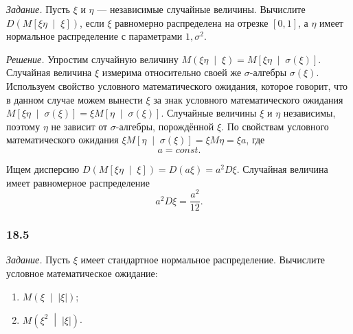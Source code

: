 \textit{Задание.} Пусть $ \xi $ и $ \eta $ --- независимые случайные величины.
Вычислите $D \left( M \left[ \xi \eta \; \middle| \; \xi \right] \right) $,
если $ \xi $ равномерно распределена на отрезке $ \left[ 0, 1 \right] $,
а $ \eta $ имеет нормальное распределение с параметрами $1, \sigma^2$.

\textit{Решение.} Упростим случайную величину
$M \left( \xi \eta \; \middle| \; \xi \right) =
  M \left[ \xi \eta \; \middle| \; \sigma \left( \xi \right) \right] $.
Случайная величина $ \xi $ измерима относительно своей же $ \sigma $-алгебры
$ \sigma \left( \xi \right) $.
Используем свойство условного математического ожидания, которое говорит,
что в данном случае можем вынести $ \xi $ за знак условного математического ожидания
$M \left[ \xi \eta \; \middle| \; \sigma \left( \xi \right) \right] =
  \xi M \left[ \eta \; \middle| \; \sigma \left( \xi \right) \right].$
Случайные величины $ \xi $ и $ \eta $ независимы, поэтому $ \eta $ не зависит от $ \sigma $-алгебры,
порождённой $ \xi $.
По свойствам условного математического ожидания
$ \xi M \left[ \eta \; \middle| \; \sigma \left( \xi \right) \right] =
  \xi M \eta =
  \xi a$,
где
$$a = const.$$

Ищем дисперсию
$D \left( M \left[ \xi \eta \; \middle| \; \xi \right] \right) =
  D \left( a \xi \right) =
  a^2 D \xi.$
Случайная величина имеет равномерное распределение
$$a^2 D \xi =
  \frac{a^2}{12}.$$

\subsubsection*{18.5}

\textit{Задание.} Пусть $ \xi $ имеет стандартное нормальное распределение.
Вычислите условное математическое ожидание:
\begin{enumerate}[label=\alph*)]
  \item $M \left( \xi \; \middle| \; \left| \xi \right| \right) $;
  \item $M \left( \xi^2 \; \middle| \; \left| \xi \right| \right) $.
\end{enumerate}

